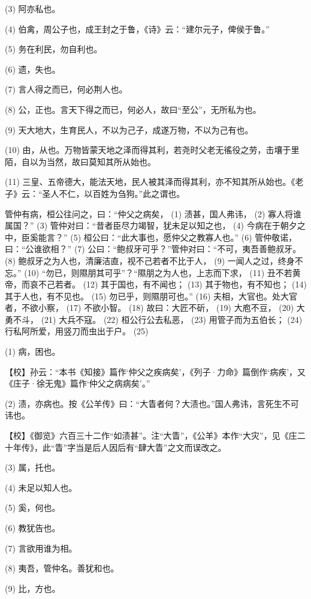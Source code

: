 \documentclass[12pt,UTF8]{ctexbook}
\begin{document}
(3) 阿亦私也。

(4) 伯禽，周公子也，成王封之于鲁，《诗》云：“建尔元子，俾侯于鲁。”

(5) 务在利民，勿自利也。

(6) 遗，失也。

(7) 言人得之而已，何必荆人也。

(8) 公，正也。言天下得之而已，何必人，故曰“至公”，无所私为也。

(9) 天大地大，生育民人，不以为己子，成遂万物，不以为己有也。

(10) 由，从也。万物皆蒙天地之泽而得其利，若尧时父老无徭役之劳，击壤于里陌，自以为当然，故曰莫知其所从始也。

(11) 三皇、五帝德大，能法天地，民人被其泽而得其利，亦不知其所从始也。《老子》云：“圣人不仁，以百姓为刍狗。”此之谓也。

管仲有病，桓公往问之，曰：“仲父之病矣， (1) 渍甚，国人弗讳， (2) 寡人将谁属国？” (3) 管仲对曰：“昔者臣尽力竭智，犹未足以知之也， (4) 今病在于朝夕之中，臣奚能言？” (5) 桓公曰：“此大事也，愿仲父之教寡人也。” (6) 管仲敬诺，曰：“公谁欲相？” (7) 公曰：“鲍叔牙可乎？”管仲对曰：“不可，夷吾善鲍叔牙。 (8) 鲍叔牙之为人也，清廉洁直，视不己若者不比于人， (9) 一闻人之过，终身不忘。” (10) “勿已，则隰朋其可乎”？“隰朋之为人也，上志而下求， (11) 丑不若黄帝，而哀不己若者。 (12) 其于国也，有不闻也； (13) 其于物也，有不知也； (14) 其于人也，有不见也。 (15) 勿已乎，则隰朋可也。” (16) 夫相，大官也。处大官者，不欲小察， (17) 不欲小智。 (18) 故曰：大匠不斫， (19) 大庖不豆， (20) 大勇不斗， (21) 大兵不寇。 (22) 桓公行公去私恶， (23) 用管子而为五伯长； (24) 行私阿所爱，用竖刀而虫出于户。 (25)

(1) 病，困也。

【校】孙云：“本书《知接》篇作‘仲父之疾病矣’，《列子·力命》篇倒作‘病疾’，又《庄子·徐无鬼》篇作‘仲父之病病矣’。”

(2) 渍，亦病也。按《公羊传》曰：“大眚者何？大渍也。”国人弗讳，言死生不可讳也。

【校】《御览》六百三十二作“如渍甚”。注“大眚”，《公羊》本作“大灾”，见《庄二十年传》，此“眚”字当是后人因后有“肆大眚”之文而误改之。

(3) 属，托也。

(4) 未足以知人也。

(5) 奚，何也。

(6) 教犹告也。

(7) 言欲用谁为相。

(8) 夷吾，管仲名。善犹和也。

(9) 比，方也。
\end{document}
